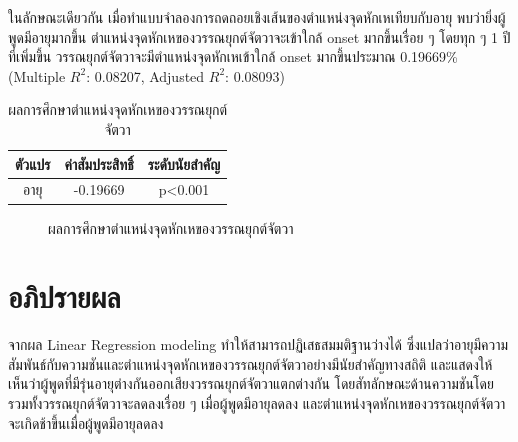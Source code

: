 \documentclass[a4paper]{article}
\begin{document}
    ในลักษณะเดียวกัน เมื่อทำแบบจําลองการถดถอยเชิงเส้นของตำแหน่งจุดหักเหเทียบกับอายุ พบว่ายิ่งผู้พูดมีอายุมากขึ้น ตำแหน่งจุดหักเหของวรรณยุกต์จัตวาจะเข้าใกล้ onset มากขึ้นเรื่อย ๆ โดยทุก ๆ 1 ปีที่เพิ่มขึ้น วรรณยุกต์จัตวาจะมีตำแหน่งจุดหักเหเข้าใกล้ onset มากขึ้นประมาณ 0.19669\% (Multiple $R^2$: 0.08207, Adjusted $R^2$: 0.08093)
    \begin{table}[!ht]
        \begin{center}
        \begin{tabular}{|c|c|c|}
            \hline
            ตัวแปร & ค่าสัมประสิทธิ์ & ระดับนัยสำคัญ \\
            \hline
            อายุ & -0.19669 & p<0.001 \\
            \hline
        \end{tabular}
        \end{center}
        \caption{ผลการศึกษาตำแหน่งจุดหักเหของวรรณยุกต์จัตวา}
    \end{table}
    \begin{figure}[!ht]
        \begin{center}
        \end{center}
        \caption{ผลการศึกษาตำแหน่งจุดหักเหของวรรณยุกต์จัตวา}
    \end{figure}
\section{อภิปรายผล}
    จากผล Linear Regression modeling ทำให้สามารถปฏิเสธสมมติฐานว่างได้ ซึ่งแปลว่าอายุมีความสัมพันธ์กับความชันและตำแหน่งจุดหักเหของวรรณยุกต์จัตวาอย่างมีนัยสำคัญทางสถิติ และแสดงให้เห็นว่าผู้พูดที่มีรุ่นอายุต่างกันออกเสียงวรรณยุกต์จัตวาแตกต่างกัน โดยสัทลักษณะด้านความชันโดยรวมทั้งวรรณยุกต์จัตวาจะลดลงเรื่อย ๆ เมื่อผู้พูดมีอายุลดลง และตำแหน่งจุดหักเหของวรรณยุกต์จัตวาจะเกิดช้าขึ้นเมื่อผู้พูดมีอายุลดลง
\end{document}
